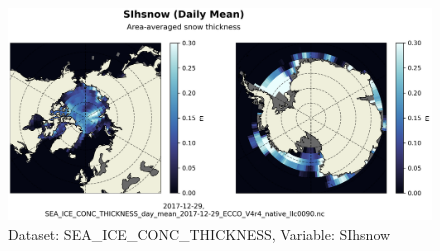 \begin{figure}[H]
\centering
\includegraphics[scale=0.55]{../images/plots/native_plots/Sea-Ice_and_Snow_Concentration_and_Thickness/SIhsnow.png}
\caption{Dataset: SEA\_ICE\_CONC\_THICKNESS, Variable: SIhsnow}
\label{tab:table-SEA_ICE_CONC_THICKNESS_SIhsnow-Plot}
\end{figure}
\pagebreak
